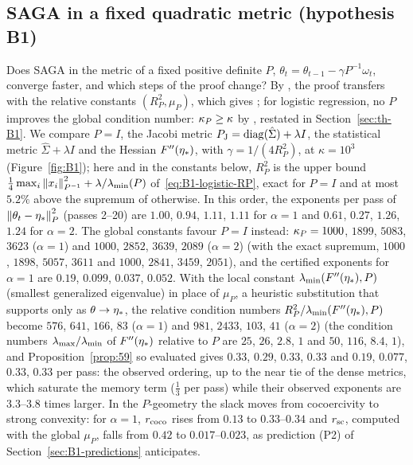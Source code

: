 \subsection{SAGA in a fixed quadratic metric (hypothesis B1)}\label{sec:exp-B1}

Does SAGA in the metric of a fixed positive definite $P$, $\theta_t=\theta_{t-1}-\gamma P^{-1}\omega_t$, converge faster,
and which steps of the proof change? By , the proof transfers with the relative constants
$(R_P^2,\mu_P)$, which gives ; for logistic regression, no $P$ improves the global condition number:
$\kappa_P\ge\kappa$ by , restated in Section~\ref{sec:th-B1}. We compare $P=I$, the Jacobi
metric $P_{\rm J}=\operatorname{diag}(\hat\Sigma)+\lambda I$, the statistical metric $\hat\Sigma+\lambda I$ and the Hessian
$F''(\eta_\ast)$, with $\gamma=1/(4R_P^2)$, at $\kappa=10^3$ (Figure~\ref{fig:B1}); here and in the constants below,
$R_P^2$ is the upper bound $\frac14\max_i\left\|x_i\right\|_{P^{-1}}^2+\lambda/\lambda_{\min}(P)$ of~\eqref{eq:B1-logistic-RP}, exact for
$P=I$ and at most $5.2\%$ above the supremum of  otherwise. In this order, the exponents per pass of
$\left\|\theta_t-\eta_\ast\right\|_P^2$ (passes 2--20) are $1.00$, $0.94$, $1.11$, $1.11$ for $\alpha=1$ and $0.61$, $0.27$,
$1.26$, $1.24$ for $\alpha=2$. The global constants favour $P=I$ instead: $\kappa_P=1000$, $1899$, $5083$, $3623$
($\alpha=1$) and $1000$, $2852$, $3639$, $2089$ ($\alpha=2$) (with the exact supremum, $1000$, $1898$, $5057$, $3611$ and
$1000$, $2841$, $3459$, $2051$), and the certified exponents for $\alpha=1$ are $0.19$, $0.099$, $0.037$, $0.052$. With
the local constant $\lambda_{\min}(F''(\eta_\ast),P)$ (smallest generalized eigenvalue) in place of $\mu_P$, a heuristic
substitution that  supports only as $\theta\to\eta_\ast$, the relative condition numbers
$R_P^2/\lambda_{\min}(F''(\eta_\ast),P)$ become $576$, $641$, $166$, $83$ ($\alpha=1$) and $981$, $2433$, $103$, $41$ ($\alpha=2$)
(the condition numbers $\lambda_{\max}/\lambda_{\min}$ of $F''(\eta_\ast)$ relative to $P$ are $25$, $26$, $2.8$, $1$ and $50$, $116$, $8.4$,
$1$), and Proposition~\ref{prop:59} so evaluated gives $0.33$, $0.29$, $0.33$, $0.33$ and $0.19$, $0.077$, $0.33$, $0.33$
per pass: the observed ordering, up to the near tie of the dense metrics, which saturate the memory term ($\frac13$ per
pass) while their observed exponents are $3.3$--$3.8$ times larger. In the $P$-geometry the slack moves from cocoercivity
to strong convexity: for $\alpha=1$, $r_{\rm coco}$ rises from $0.13$ to $0.33$--$0.34$ and $r_{\rm sc}$, computed with
the global $\mu_P$, falls from $0.42$ to $0.017$--$0.023$, as prediction (P2) of Section~\ref{sec:B1-predictions} anticipates.

